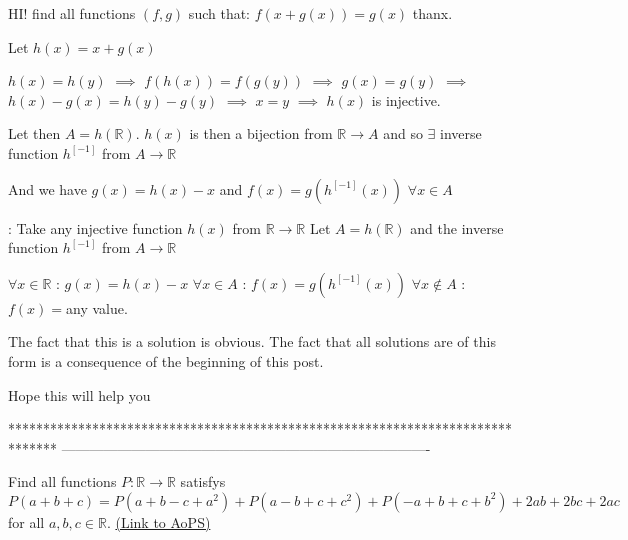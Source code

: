 \begin{solution}
	\begin{tcolorbox}HI!
find all functions $ (f,g)$ such that:
$ f(x + g(x)) = g(x)$
thanx.\end{tcolorbox}

Let $ h(x)=x+g(x)$

$ h(x)=h(y)$ $ \implies$ $ f(h(x))=f(g(y))$ $ \implies$ $ g(x)=g(y)$ $ \implies$ $ h(x)-g(x)=h(y)-g(y)$ $ \implies$ $ x=y$ $ \implies$ $ h(x)$ is injective.

Let then $ A=h(\mathbb R)$. $ h(x)$ is then a bijection from $ \mathbb R \to A$ and so $ \exists$ inverse function $ h^{[-1]}$ from $ A\to\mathbb R$

And we have $ g(x)=h(x)-x$ and $ f(x)=g(h^{[-1]}(x))$ $ \forall x\in A$

:
Take any injective function $ h(x)$ from $ \mathbb R\to\mathbb R$
Let $ A=h(\mathbb R)$ and the inverse function $ h^{[-1]}$ from $ A\to\mathbb R$

$ \forall x\in \mathbb R$ : $ g(x)=h(x)-x$
$ \forall x\in A$ : $ f(x)=g(h^{[-1]}(x))$
$ \forall x\notin A$ : $ f(x)=$any value.

The fact that this is a solution is obvious.
The fact that all solutions are of this form is a consequence of the beginning of this post.

Hope this will help you  
\end{solution}
*******************************************************************************
-------------------------------------------------------------------------------

\begin{problem}
	Find all functions $ P: \mathbb{R} \to \mathbb{R}$ satisfys
\[ P(a+b+c) = P(a+b-c+a^2) + P(a-b+c+c^2) + P(-a+b+c+b^2) + 2ab + 2bc + 2ac\]
for all $ a,b,c \in \mathbb{R}$.
	\flushright \href{https://artofproblemsolving.com/community/c6h278156}{(Link to AoPS)}
\end{problem}



